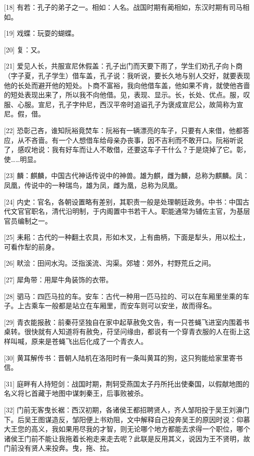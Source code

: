 \documentclass[12pt,UTF8]{ctexbook}
\begin{document}
[18] 有若：孔子的弟子之一。相如：人名。战国时期有蔺相如，东汉时期有司马相如。

[19] 戏蝶：玩耍的蝴蝶。

[20] 复：又。

[21] 爱见人长，共服宣尼休假盖：孔子出门而天要下雨了，学生们劝孔子向卜商（字子夏，孔子学生）借车盖，孔子说：我听说，要长久地与别人交好，就要表现他的长处而避开他的短处。卜商不富裕，我向他借车盖，他如果不肯，就使他吝啬的短处表现出来了，所以我不向他借。见，表现、显示。长，长处、优点。服，叹服、心服。宣尼，孔子字仲尼，西汉平帝时追谥孔子为褒成宣尼公，故简称为宣尼。假，借。

[22] 恐彰己吝，谁知阮裕竟焚车：阮裕有一辆漂亮的车子，只要有人来借，他都答应，从不吝啬。有一个人想借车给母亲办丧事，因不吉利而不敢开口。阮裕听说了，感叹地说：我有好车而让人不敢借，还要这车子干什么？于是烧掉了它。彰，使……明显。

[23] 麟：麒麟，中国古代神话传说中的神兽。雄为麒，雌为麟，总称为麒麟。凤：凤凰，传说中的一种瑞鸟，雄为凤，雌为凰，总称为凤凰。

[24] 内史：官名，各朝设置略有差别，其职责一般是处理朝廷政务。中书：中国古代文官官职名，清代沿明制，于内阁置中书若干人。职能通常为辅佐主官，为基层官员编制之一。

[25] 耒耜：古代的一种翻土农具，形如木叉，上有曲柄，下面是犁头，用以松土，可看作犁的前身。

[26] 畎浍：田间水沟。泛指溪流、沟渠。郊墟：郊外，村野荒丘之间。

[27] 犀角带：用犀牛角装饰的衣带。

[28] 驷马：四匹马拉的车。安车：古代一种用一匹马拉的、可以在车厢里坐乘的车子。上古乘车一般都是站立在车厢里，而安车则可以安坐，故而得名。

[29] 青衣能报赦：前秦苻坚独自在家中起草赦免文告，有一只苍蝇飞进室内围着书桌转。很快就有人知道将有赦免，苻坚问缘由，都说有一个穿青衣服的人在街上这样叫喊，原来是苍蝇飞出后化成了一个青衣人。

[30] 黄耳解传书：晋朝人陆机在洛阳时有一条叫黄耳的狗，这只狗能给家里寄书信。

[31] 庭畔有人持短剑：战国时期，荆轲受燕国太子丹所托出使秦国，以假献地图的名义将匕首藏于地图中谋刺秦王，后事败被杀。

[32] 门前无客曳长裾：西汉初期，各诸侯王都招聘贤人，齐人邹阳投于吴王刘濞门下。后吴王图谋造反，邹阳便上书劝阻，文中解释自己投奔吴王的原因时说：仰慕大王您的高义，我如果用尽我的才智，则无论哪个地方都能去求得一个职位，哪个诸侯王门前不能让我拖着长袍走来走去呢？此联是反用其义，说因为王不贤明，故门前没有贤人来投奔。曳，拖、拉。
\end{document}

